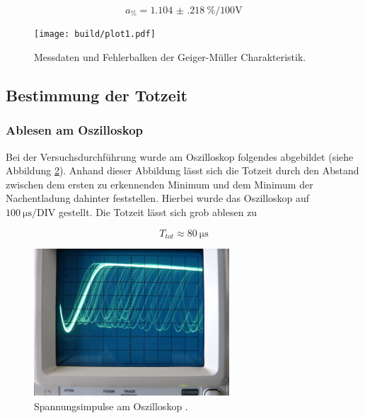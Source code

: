 \begin{flushleft}
\begin{equation}
a_{\si{\percent}} = \SI{1.104(218)}{\percent\per{100}\volt}
\end{equation}

%

\end{flushleft}
\begin{figure}[h]
  \centering
  \texttt{[image: build/plot1.pdf]}
  \caption{Messdaten und Fehlerbalken der Geiger-Müller Charakteristik.}
  \label{fig:plot1}
\end{figure}

\subsection{Bestimmung der Totzeit}

\subsubsection{Ablesen am Oszilloskop}
Bei der Versuchsdurchführung wurde am Oszilloskop folgendes abgebildet (siehe Abbildung \ref{fig:abb4}).
Anhand dieser Abbildung lässt sich die Totzeit durch den Abstand zwischen dem ersten zu erkennenden Minimum und dem Minimum der Nachentladung dahinter 
feststellen. Hierbei wurde das Oszilloskop auf $\SI{100}{\micro\second\per{\text{DIV}}}$ gestellt.
Die Totzeit lässt sich grob ablesen zu

\begin{equation*}
T_{tot} \approx \SI{80}{\micro\second}
\end{equation*}

\begin{figure}[h]
  \centering
  \includegraphics[width=0.65\textwidth]{bilder/Abbildung4.png}
  \caption{Spannungsimpulse am Oszilloskop \cite{ap031}.}
  \label{fig:abb4}
\end{figure}



